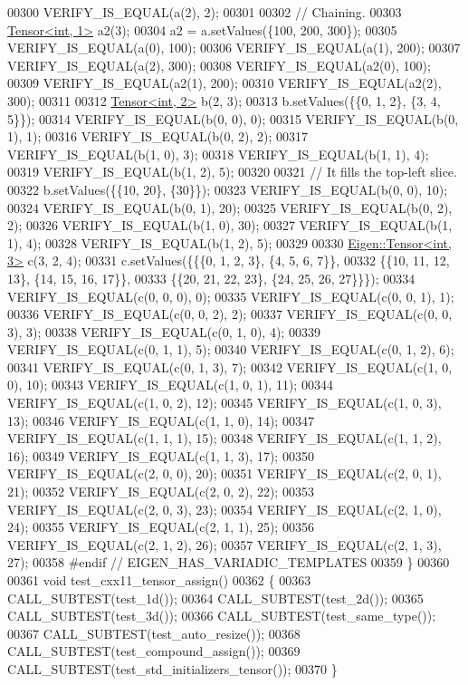\begin{DoxyCode}
00300   VERIFY\_IS\_EQUAL(a(2), 2);
00301 
00302   \textcolor{comment}{// Chaining.}
00303   \hyperlink{class_eigen_1_1_tensor}{Tensor<int, 1>} a2(3);
00304   a2 = a.setValues(\{100, 200, 300\});
00305   VERIFY\_IS\_EQUAL(a(0), 100);
00306   VERIFY\_IS\_EQUAL(a(1), 200);
00307   VERIFY\_IS\_EQUAL(a(2), 300);
00308   VERIFY\_IS\_EQUAL(a2(0), 100);
00309   VERIFY\_IS\_EQUAL(a2(1), 200);
00310   VERIFY\_IS\_EQUAL(a2(2), 300);
00311 
00312   \hyperlink{class_eigen_1_1_tensor}{Tensor<int, 2>} b(2, 3);
00313   b.setValues(\{\{0, 1, 2\}, \{3, 4, 5\}\});
00314   VERIFY\_IS\_EQUAL(b(0, 0), 0);
00315   VERIFY\_IS\_EQUAL(b(0, 1), 1);
00316   VERIFY\_IS\_EQUAL(b(0, 2), 2);
00317   VERIFY\_IS\_EQUAL(b(1, 0), 3);
00318   VERIFY\_IS\_EQUAL(b(1, 1), 4);
00319   VERIFY\_IS\_EQUAL(b(1, 2), 5);
00320 
00321   \textcolor{comment}{// It fills the top-left slice.}
00322   b.setValues(\{\{10, 20\}, \{30\}\});
00323   VERIFY\_IS\_EQUAL(b(0, 0), 10);
00324   VERIFY\_IS\_EQUAL(b(0, 1), 20);
00325   VERIFY\_IS\_EQUAL(b(0, 2), 2);
00326   VERIFY\_IS\_EQUAL(b(1, 0), 30);
00327   VERIFY\_IS\_EQUAL(b(1, 1), 4);
00328   VERIFY\_IS\_EQUAL(b(1, 2), 5);
00329 
00330   \hyperlink{class_eigen_1_1_tensor}{Eigen::Tensor<int, 3>} c(3, 2, 4);
00331   c.setValues(\{\{\{0, 1, 2, 3\}, \{4, 5, 6, 7\}\},
00332                \{\{10, 11, 12, 13\}, \{14, 15, 16, 17\}\},
00333                \{\{20, 21, 22, 23\}, \{24, 25, 26, 27\}\}\});
00334   VERIFY\_IS\_EQUAL(c(0, 0, 0), 0);
00335   VERIFY\_IS\_EQUAL(c(0, 0, 1), 1);
00336   VERIFY\_IS\_EQUAL(c(0, 0, 2), 2);
00337   VERIFY\_IS\_EQUAL(c(0, 0, 3), 3);
00338   VERIFY\_IS\_EQUAL(c(0, 1, 0), 4);
00339   VERIFY\_IS\_EQUAL(c(0, 1, 1), 5);
00340   VERIFY\_IS\_EQUAL(c(0, 1, 2), 6);
00341   VERIFY\_IS\_EQUAL(c(0, 1, 3), 7);
00342   VERIFY\_IS\_EQUAL(c(1, 0, 0), 10);
00343   VERIFY\_IS\_EQUAL(c(1, 0, 1), 11);
00344   VERIFY\_IS\_EQUAL(c(1, 0, 2), 12);
00345   VERIFY\_IS\_EQUAL(c(1, 0, 3), 13);
00346   VERIFY\_IS\_EQUAL(c(1, 1, 0), 14);
00347   VERIFY\_IS\_EQUAL(c(1, 1, 1), 15);
00348   VERIFY\_IS\_EQUAL(c(1, 1, 2), 16);
00349   VERIFY\_IS\_EQUAL(c(1, 1, 3), 17);
00350   VERIFY\_IS\_EQUAL(c(2, 0, 0), 20);
00351   VERIFY\_IS\_EQUAL(c(2, 0, 1), 21);
00352   VERIFY\_IS\_EQUAL(c(2, 0, 2), 22);
00353   VERIFY\_IS\_EQUAL(c(2, 0, 3), 23);
00354   VERIFY\_IS\_EQUAL(c(2, 1, 0), 24);
00355   VERIFY\_IS\_EQUAL(c(2, 1, 1), 25);
00356   VERIFY\_IS\_EQUAL(c(2, 1, 2), 26);
00357   VERIFY\_IS\_EQUAL(c(2, 1, 3), 27);
00358 \textcolor{preprocessor}{#endif  // EIGEN\_HAS\_VARIADIC\_TEMPLATES}
00359 \}
00360 
00361 \textcolor{keywordtype}{void} test\_cxx11\_tensor\_assign()
00362 \{
00363   CALL\_SUBTEST(test\_1d());
00364   CALL\_SUBTEST(test\_2d());
00365   CALL\_SUBTEST(test\_3d());
00366   CALL\_SUBTEST(test\_same\_type());
00367   CALL\_SUBTEST(test\_auto\_resize());
00368   CALL\_SUBTEST(test\_compound\_assign());
00369   CALL\_SUBTEST(test\_std\_initializers\_tensor());
00370 \}
\end{DoxyCode}
